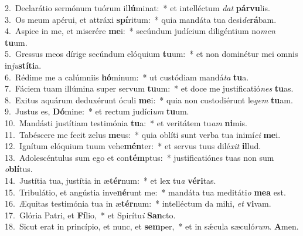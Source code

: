 {2.~}Declarátio sermónum tuórum il\textbf{lú}minat:~* et intelléctum \textit{dat} \textbf{pár}\textbf{vu}lis.\\
{3.~}Os meum apérui, et attráxi \textbf{spí}ritum:~* quia mandáta tua desi\textit{de}\textbf{rá}bam.\\
{4.~}Aspice in me, et miserére \textbf{me}i:~* secúndum judícium diligéntium no\textit{men} \textbf{tu}um.\\
{5.~}Gressus meos dírige secúndum elóquium \textbf{tu}um:~* et non dominétur mei omnis in\textit{ju}\textbf{stí}\textbf{ti}a.\\
{6.~}Rédime me a calúmniis \textbf{hó}minum:~* ut custódiam mandá\textit{ta} \textbf{tu}a.\\
{7.~}Fáciem tuam illúmina super servum \textbf{tu}um:~* et doce me justificatió\textit{nes} \textbf{tu}as.\\
{8.~}Exitus aquárum deduxérunt óculi \textbf{me}i:~* quia non custodiérunt le\textit{gem} \textbf{tu}am.\\
{9.~}Justus es, \textbf{Dó}mine:~* et rectum judíci\textit{um} \textbf{tu}um.\\
{10.~}Mandásti justítiam testimónia \textbf{tu}a:~* et veritátem tu\textit{am} \textbf{ni}mis.\\
{11.~}Tabéscere me fecit zelus \textbf{me}us:~* quia oblíti sunt verba tua inimí\textit{ci} \textbf{me}i.\\
{12.~}Ignítum elóquium tuum vehe\textbf{mén}ter:~* et servus tuus dilé\textit{xit} \textbf{il}lud.\\
{13.~}Adolescéntulus sum ego et con\textbf{tém}ptus:~* justificatiónes tuas non sum \textit{o}\textbf{blí}tus.\\
{14.~}Justítia tua, justítia in æ\textbf{tér}num:~* et lex tu\textit{a} \textbf{vé}\textbf{ri}tas.\\
{15.~}Tribulátio, et angústia inve\textbf{né}runt me:~* mandáta tua meditáti\textit{o} \textbf{me}\textbf{a} est.\\
{16.~}Æquitas testimónia tua in æ\textbf{tér}num:~* intelléctum da mihi, \textit{et} \textbf{vi}vam.\\
{17.~}Glória Patri, et \textbf{Fí}lio,~* et Spirítu\textit{i} \textbf{San}cto.\\
{18.~}Sicut erat in princípio, et nunc, et \textbf{sem}per,~* et in sǽcula sæculó\textit{rum}. \textbf{A}men.\\
